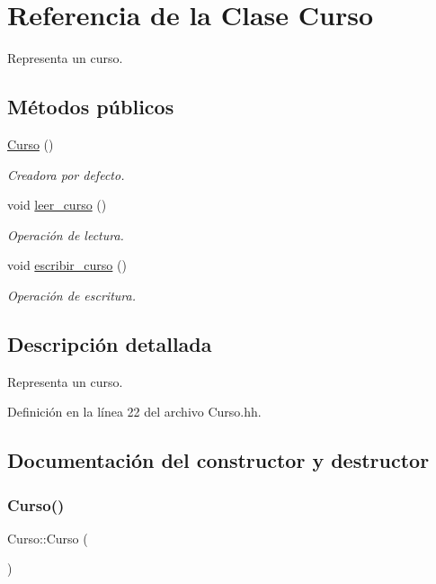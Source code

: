 \hypertarget{class_curso}{}\section{Referencia de la Clase Curso}
\label{class_curso}


Representa un curso.  


\subsection*{Métodos públicos}
\begin{DoxyCompactItemize}
\item 
\mbox{\hyperlink{class_curso_add3bcc7fd065fa02b8fad76cedcc3a8a}{Curso}} ()
\begin{DoxyCompactList}\small\item\em Creadora por defecto. \end{DoxyCompactList}\item 
void \mbox{\hyperlink{class_curso_a1ea06a246148abfe3651e3aa7fa25618}{leer\+\_\+curso}} ()
\begin{DoxyCompactList}\small\item\em Operación de lectura. \end{DoxyCompactList}\item 
void \mbox{\hyperlink{class_curso_ac196f3a5a5d30d41d2c0a0c295f052d3}{escribir\+\_\+curso}} ()
\begin{DoxyCompactList}\small\item\em Operación de escritura. \end{DoxyCompactList}\end{DoxyCompactItemize}


\subsection{Descripción detallada}
Representa un curso. 

Definición en la línea 22 del archivo Curso.\+hh.



\subsection{Documentación del constructor y destructor}
\mbox{\label{class_curso_add3bcc7fd065fa02b8fad76cedcc3a8a}} 
\subsubsection{\texorpdfstring{Curso()}{Curso()}}
{\footnotesize\ttfamily Curso\+::\+Curso (\begin{DoxyParamCaption}{ }\end{DoxyParamCaption})}



